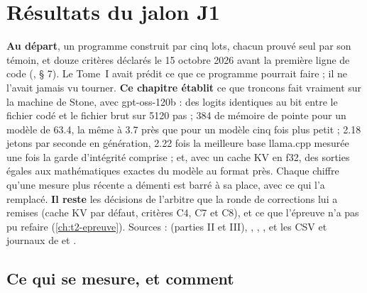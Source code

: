\ifdefined\GrapheResVitesse\else\fi

\chapter{Résultats du jalon J1}\label{ch:t2-resultats}

\begin{origine}
\textbf{Au départ}, un programme construit par cinq lots, chacun prouvé seul par son témoin, et douze critères déclarés le 15 octobre 2026 avant la première ligne de code (, § 7). Le Tome~I avait prédit ce que ce programme pourrait faire ; il ne l'avait jamais vu tourner.
\textbf{Ce chapitre établit} ce que troncons fait vraiment sur la machine de Stone, avec gpt-oss-120b : des logits identiques au bit entre le fichier codé et le fichier brut sur \num{5120} pas ; \SI{384}{\Mo} de mémoire de pointe pour un modèle de \SI{63.4}{\Go}, la même à \SI{3.7}{\Mo} près que pour un modèle cinq fois plus petit ; \num{2.18} jetons par seconde en génération, \num{2.22} fois la meilleure base llama.cpp mesurée une fois la garde d'intégrité comprise ; et, avec un cache KV en f32, des sorties égales aux mathématiques exactes du modèle au format près. Chaque chiffre qu'une mesure plus récente a démenti est barré à sa place, avec ce qui l'a remplacé.
\textbf{Il reste} les décisions de l'arbitre que la ronde de corrections lui a remises (cache KV par défaut, critères C4, C7 et C8), et ce que l'épreuve n'a pas pu refaire (\cref{ch:t2-epreuve}).
Sources :  (parties II et III), , , , et les CSV et journaux de  et .
\end{origine}

\section{Ce qui se mesure, et comment}\label{t2res-sec:protocole}


